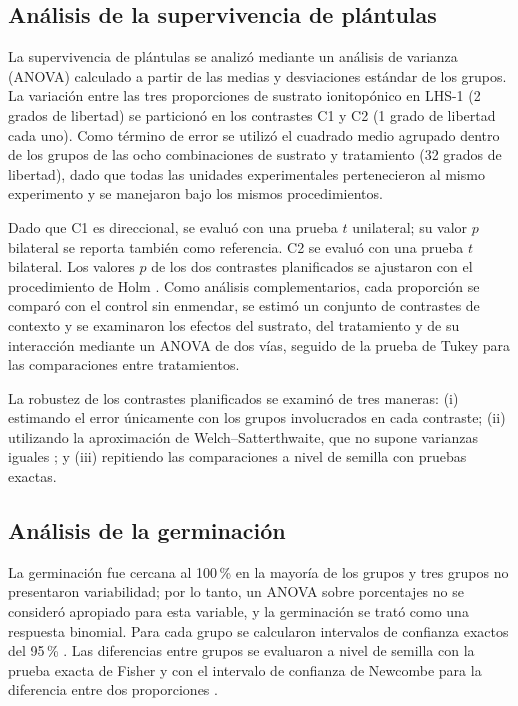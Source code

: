 \documentclass[11pt]{article}
\begin{document}
\subsection{Análisis de la supervivencia de plántulas}

La supervivencia de plántulas se analizó mediante un análisis de varianza (ANOVA) calculado a partir de las medias y desviaciones estándar de los grupos. La variación entre las tres proporciones de sustrato ionitopónico en LHS-1 (2 grados de libertad) se particionó en los contrastes C1 y C2 (1 grado de libertad cada uno). Como término de error se utilizó el cuadrado medio agrupado dentro de los grupos de las ocho combinaciones de sustrato y tratamiento (32 grados de libertad), dado que todas las unidades experimentales pertenecieron al mismo experimento y se manejaron bajo los mismos procedimientos.

Dado que C1 es direccional, se evaluó con una prueba $t$ unilateral; su valor $p$ bilateral se reporta también como referencia. C2 se evaluó con una prueba $t$ bilateral. Los valores $p$ de los dos contrastes planificados se ajustaron con el procedimiento de Holm \citep{holm}. Como análisis complementarios, cada proporción se comparó con el control sin enmendar, se estimó un conjunto de contrastes de contexto y se examinaron los efectos del sustrato, del tratamiento y de su interacción mediante un ANOVA de dos vías, seguido de la prueba de Tukey para las comparaciones entre tratamientos.

La robustez de los contrastes planificados se examinó de tres maneras: (i) estimando el error únicamente con los grupos involucrados en cada contraste; (ii) utilizando la aproximación de Welch--Satterthwaite, que no supone varianzas iguales \citep{welch,satterthwaite}; y (iii) repitiendo las comparaciones a nivel de semilla con pruebas exactas.

\subsection{Análisis de la germinación}

La germinación fue cercana al 100\,\% en la mayoría de los grupos y tres grupos no presentaron variabilidad; por lo tanto, un ANOVA sobre porcentajes no se consideró apropiado para esta variable, y la germinación se trató como una respuesta binomial. Para cada grupo se calcularon intervalos de confianza exactos del 95\,\% \citep{clopper}. Las diferencias entre grupos se evaluaron a nivel de semilla con la prueba exacta de Fisher y con el intervalo de confianza de Newcombe para la diferencia entre dos proporciones \citep{newcombe}.
\end{document}
